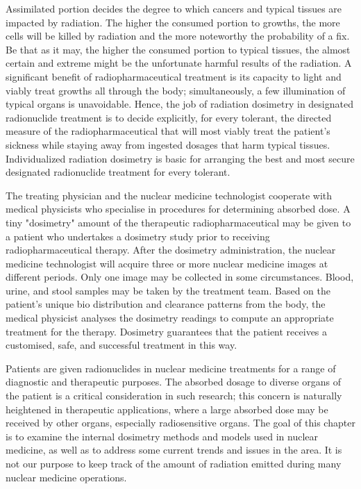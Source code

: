 \documentclass[12pt]{article}
\begin{document}
Assimilated portion decides the degree to which cancers and typical tissues are impacted by radiation. The higher the consumed portion to growths, the more cells will be killed by radiation and the more noteworthy the probability of a fix. Be that as it may, the higher the consumed portion to typical tissues, the almost certain and extreme might be the unfortunate harmful results of the radiation. A significant benefit of radiopharmaceutical treatment is its capacity to light and viably treat growths all through the body; simultaneously, a few illumination of typical organs is unavoidable. Hence, the job of radiation dosimetry in designated radionuclide treatment is to decide explicitly, for every tolerant, the directed measure of the radiopharmaceutical that will most viably treat the patient's sickness while staying away from ingested dosages that harm typical tissues. Individualized radiation dosimetry is basic for arranging the best and most secure designated radionuclide treatment for every tolerant.
\par
The treating physician and the nuclear medicine technologist cooperate with medical physicists who specialise in procedures for determining absorbed dose. A tiny "dosimetry" amount of the therapeutic radiopharmaceutical may be given to a patient who undertakes a dosimetry study prior to receiving radiopharmaceutical therapy. After the dosimetry administration, the nuclear medicine technologist will acquire three or more nuclear medicine images at different periods. Only one image may be collected in some circumstances. Blood, urine, and stool samples may be taken by the treatment team. Based on the patient's unique bio distribution and clearance patterns from the body, the medical physicist analyses the dosimetry readings to compute an appropriate treatment for the therapy. Dosimetry guarantees that the patient receives a customised, safe, and successful treatment in this way.
\par
Patients are given radionuclides in nuclear medicine treatments for a range of diagnostic and therapeutic purposes. The absorbed dosage to diverse organs of the patient is a critical consideration in such research; this concern is naturally heightened in therapeutic applications, where a large absorbed dose may be received by other organs, especially radiosensitive organs. The goal of this chapter is to examine the internal dosimetry methods and models used in nuclear medicine, as well as to address some current trends and issues in the area. It is not our purpose to keep track of the amount of radiation emitted during many nuclear medicine operations.
\end{document}
